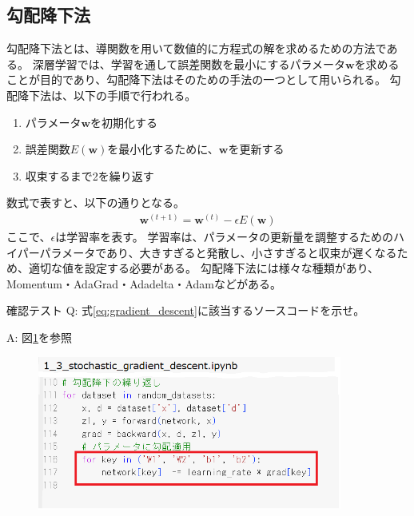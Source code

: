 \documentclass{ltjsarticle}
\begin{document}
\subsection{勾配降下法}
勾配降下法とは、導関数を用いて数値的に方程式の解を求めるための方法である。
深層学習では、学習を通して誤差関数を最小にするパラメータ$\mathbf{w}$を求めることが目的であり、勾配降下法はそのための手法の一つとして用いられる。
勾配降下法は、以下の手順で行われる。
\begin{enumerate}
  \item パラメータ$\mathbf{w}$を初期化する
  \item 誤差関数$E(\mathbf{w})$を最小化するために、$\mathbf{w}$を更新する
  \item 収束するまで2を繰り返す
\end{enumerate}
数式で表すと、以下の通りとなる。
\begin{align}
  \label{eq:gradient_descent}
  \mathbf{w}^{(t+1)} = \mathbf{w}^{(t)} - \epsilon E(\mathbf{w})
\end{align}
ここで、$\epsilon$は学習率を表す。
学習率は、パラメータの更新量を調整するためのハイパーパラメータであり、大きすぎると発散し、小さすぎると収束が遅くなるため、適切な値を設定する必要がある。
勾配降下法には様々な種類があり、Momentum・AdaGrad・Adadelta・Adamなどがある。
\begin{itembox}[l]{確認テスト}
  Q: 式\eqref{eq:gradient_descent}に該当するソースコードを示せ。

  A: 図\ref{fig:day1_06_1}を参照
\end{itembox}

\begin{figure}[ht]
  \centering
  \includegraphics[width=10cm]{./capture/confirm_test/day1_06_1.png}
  \caption{}
  \label{fig:day1_06_1}
\end{figure}
\end{document}
